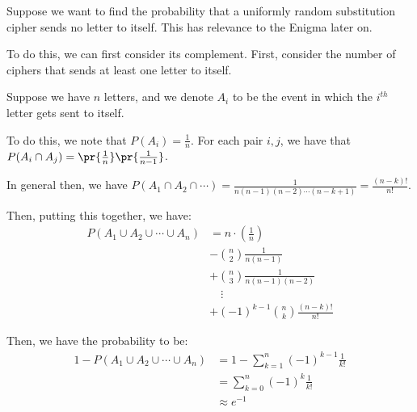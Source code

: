 \documentclass[openany]{book}
\begin{document}
\begin{example}[Enigma]
	Suppose we want to find the probability that a uniformly random substitution cipher sends no letter to itself. This has relevance to the Enigma later on.
	
	To do this, we can first consider its complement. First, consider the number of ciphers that sends at least one letter to itself.
	
	Suppose we have $n$ letters, and we denote $A_i$ to be the event in which the $i^{th}$ letter gets sent to itself.
	
	To do this, we note that $P(A_i) = \frac{1}{n}$. For each pair $i, j$, we have that $P(A_i \cap A_j) = \pr{\frac{1}{n}}\pr{\frac{1}{n-1}}$.
	
	In general then, we have $P(A_1 \cap A_2 \cap \cdots) = \frac{1}{n(n-1)(n-2)\cdots(n-k+1)} = \frac{(n-k)!}{n!}$.
	
	Then, putting this together, we have:
	\begin{align*}
		P(A_1 \cup A_2 \cup \cdots \cup A_n) &= n \cdot (\frac 1 n) \\
		&- \binom n 2 \frac 1 {n(n-1)} \\
		&+ \binom n 3 \frac 1 {n(n-1)(n-2)} \\
		&\quad\vdots \\
		&+ (-1)^{k-1} \binom n k \frac{(n-k)!}{n!}
	\end{align*}
	
	Then, we have the probability to be:
	\begin{align*}
		1 - P(A_1 \cup A_2 \cup \cdots \cup A_n) &= 1 - \sum_{k=1}^{n} (-1)^{k-1} \frac 1 {k!} \\
		&= \sum_{k=0}^{n} (-1)^{k} \frac 1 {k!} \\
		&\approx e^{-1}
	\end{align*}
\end{example}
\end{document}
